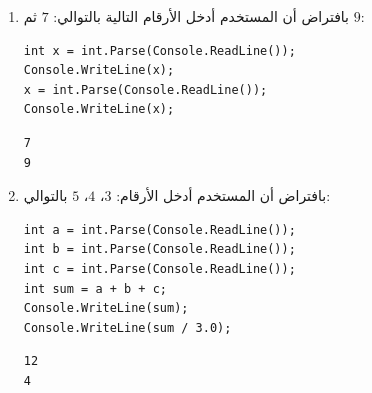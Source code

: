 \documentclass[14pt]{extarticle}
\begin{document}
\begin{enumerate}[resume, itemsep=2em]
\item
بافتراض أن المستخدم أدخل الأرقام التالية بالتوالي: $7$ ثم $9$:
\begin{english}
\begin{verbatim}
int x = int.Parse(Console.ReadLine());
Console.WriteLine(x);
x = int.Parse(Console.ReadLine());
Console.WriteLine(x);
\end{verbatim}
\end{english}
\ifwithsols
\begin{boxSolution}
\begin{english}
\begin{verbatim}
7
9
\end{verbatim}
\end{english}
\end{boxSolution}
\fi

\clearpage
\item
بافتراض أن المستخدم أدخل الأرقام: $3$، $4$، $5$ بالتوالي:
\begin{english}
\begin{verbatim}
int a = int.Parse(Console.ReadLine());
int b = int.Parse(Console.ReadLine());
int c = int.Parse(Console.ReadLine());
int sum = a + b + c;
Console.WriteLine(sum);
Console.WriteLine(sum / 3.0);
\end{verbatim}
\end{english}
\ifwithsols
\begin{boxSolution}
\begin{english}
\begin{verbatim}
12
4
\end{verbatim}
\end{english}
\end{boxSolution}
\fi

\end{enumerate}
\end{document}
